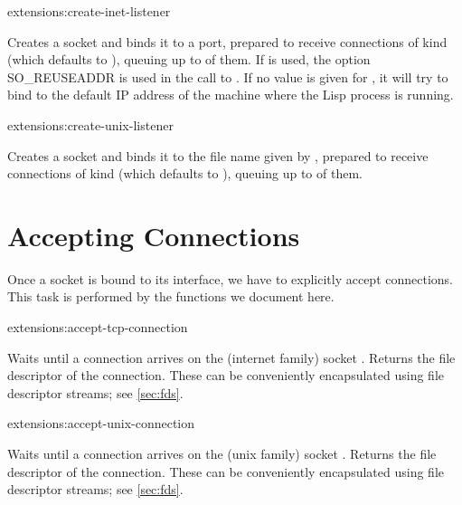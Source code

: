\begin{defun}{extensions:}{create-inet-listener}{%
    }
                     
  Creates a socket and binds it to a port, prepared to receive
  connections of kind  (which defaults to ),
  queuing up to  of them. If  
  is used, the option SO\_REUSEADDR is used in the call to .
  If no value is given for , it will try to bind to the
  default IP address of the machine where the Lisp process is running.

\end{defun}

\begin{defun}{extensions:}{create-unix-listener}{%
    }
  
  Creates a socket and binds it to the file name given by ,
  prepared to receive connections of kind  (which defaults
  to ), queuing up to  of them.

\end{defun}

\section{Accepting Connections}

Once a socket is bound to its interface, we have to explicitly accept
connections. This task is performed by the functions we document here.

\begin{defun}{extensions:}{accept-tcp-connection}{%
    }
  
  Waits until a connection arrives on the (internet family) socket
  . Returns the file descriptor of the connection.
  These can be conveniently encapsulated using file descriptor
  streams; see \ref{sec:fds}.

\end{defun}

\begin{defun}{extensions:}{accept-unix-connection}{%
    }

  Waits until a connection arrives on the (unix family) socket
  . Returns the file descriptor of the connection.
  These can be conveniently encapsulated using file descriptor
  streams; see \ref{sec:fds}.

\end{defun}

